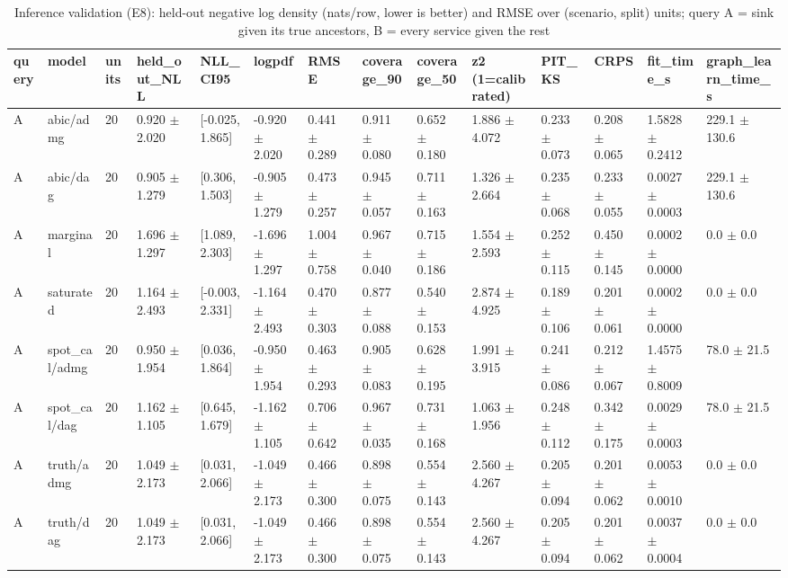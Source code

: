 \begin{table}[t]
\centering\footnotesize
\caption{Inference validation (E8): held-out negative log density (nats/row, lower is better) and RMSE over (scenario, split) units; query A = sink given its true ancestors, B = every service given the rest}\label{tab:T5_inference}
\begin{tabular}{@{}llllllllllllll@{}}
\toprule
query & model & units & held\_out\_NLL & NLL\_CI95 & logpdf & RMSE & coverage\_90 & coverage\_50 & z2 (1=calibrated) & PIT\_KS & CRPS & fit\_time\_s & graph\_learn\_time\_s\\
\midrule
A & abic/admg & 20 & 0.920 $\pm$ 2.020 & [-0.025, 1.865] & -0.920 $\pm$ 2.020 & 0.441 $\pm$ 0.289 & 0.911 $\pm$ 0.080 & 0.652 $\pm$ 0.180 & 1.886 $\pm$ 4.072 & 0.233 $\pm$ 0.073 & 0.208 $\pm$ 0.065 & 1.5828 $\pm$ 0.2412 & 229.1 $\pm$ 130.6\\
A & abic/dag & 20 & 0.905 $\pm$ 1.279 & [0.306, 1.503] & -0.905 $\pm$ 1.279 & 0.473 $\pm$ 0.257 & 0.945 $\pm$ 0.057 & 0.711 $\pm$ 0.163 & 1.326 $\pm$ 2.664 & 0.235 $\pm$ 0.068 & 0.233 $\pm$ 0.055 & 0.0027 $\pm$ 0.0003 & 229.1 $\pm$ 130.6\\
A & marginal & 20 & 1.696 $\pm$ 1.297 & [1.089, 2.303] & -1.696 $\pm$ 1.297 & 1.004 $\pm$ 0.758 & 0.967 $\pm$ 0.040 & 0.715 $\pm$ 0.186 & 1.554 $\pm$ 2.593 & 0.252 $\pm$ 0.115 & 0.450 $\pm$ 0.145 & 0.0002 $\pm$ 0.0000 & 0.0 $\pm$ 0.0\\
A & saturated & 20 & 1.164 $\pm$ 2.493 & [-0.003, 2.331] & -1.164 $\pm$ 2.493 & 0.470 $\pm$ 0.303 & 0.877 $\pm$ 0.088 & 0.540 $\pm$ 0.153 & 2.874 $\pm$ 4.925 & 0.189 $\pm$ 0.106 & 0.201 $\pm$ 0.061 & 0.0002 $\pm$ 0.0000 & 0.0 $\pm$ 0.0\\
A & spot\_cal/admg & 20 & 0.950 $\pm$ 1.954 & [0.036, 1.864] & -0.950 $\pm$ 1.954 & 0.463 $\pm$ 0.293 & 0.905 $\pm$ 0.083 & 0.628 $\pm$ 0.195 & 1.991 $\pm$ 3.915 & 0.241 $\pm$ 0.086 & 0.212 $\pm$ 0.067 & 1.4575 $\pm$ 0.8009 & 78.0 $\pm$ 21.5\\
A & spot\_cal/dag & 20 & 1.162 $\pm$ 1.105 & [0.645, 1.679] & -1.162 $\pm$ 1.105 & 0.706 $\pm$ 0.642 & 0.967 $\pm$ 0.035 & 0.731 $\pm$ 0.168 & 1.063 $\pm$ 1.956 & 0.248 $\pm$ 0.112 & 0.342 $\pm$ 0.175 & 0.0029 $\pm$ 0.0003 & 78.0 $\pm$ 21.5\\
A & truth/admg & 20 & 1.049 $\pm$ 2.173 & [0.031, 2.066] & -1.049 $\pm$ 2.173 & 0.466 $\pm$ 0.300 & 0.898 $\pm$ 0.075 & 0.554 $\pm$ 0.143 & 2.560 $\pm$ 4.267 & 0.205 $\pm$ 0.094 & 0.201 $\pm$ 0.062 & 0.0053 $\pm$ 0.0010 & 0.0 $\pm$ 0.0\\
A & truth/dag & 20 & 1.049 $\pm$ 2.173 & [0.031, 2.066] & -1.049 $\pm$ 2.173 & 0.466 $\pm$ 0.300 & 0.898 $\pm$ 0.075 & 0.554 $\pm$ 0.143 & 2.560 $\pm$ 4.267 & 0.205 $\pm$ 0.094 & 0.201 $\pm$ 0.062 & 0.0037 $\pm$ 0.0004 & 0.0 $\pm$ 0.0\\

\end{tabular}
\end{table}
